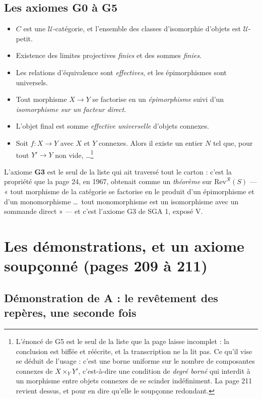 \documentclass[11pt,a4paper]{article}
\begin{document}
\subsection*{Les axiomes G0 à G5}

\begin{itemize}
\item[\textbf{G0}] $C$ est une $\mathcal{U}$-catégorie, et l'ensemble des
  classes d'isomorphie d'objets est $\mathcal{U}$-petit.
\item[\textbf{G1}] Existence des limites projectives \emph{finies} et des
  sommes \emph{finies}.
\item[\textbf{G2}] Les relations d'équivalence sont \emph{effectives}, et les
  épimorphismes sont universels.
\item[\textbf{G3}] Tout morphisme $X \to Y$ se factorise en un
  \emph{épimorphisme} suivi d'un \emph{isomorphisme sur un facteur direct}.
\item[\textbf{G4}] L'objet final est somme \emph{effective universelle}
  d'objets connexes.
\item[\textbf{G5}] Soit $f : X \to Y$ avec $X$ et $Y$ connexes. Alors il existe
  un entier $N$ tel que, pour tout $Y' \to Y$ non vide, \dots\footnote{L'énoncé
  de G5 est le seul de la liste que la page laisse incomplet : la conclusion
  est biffée et réécrite, et la transcription ne la lit pas. Ce qu'il vise se
  déduit de l'usage : c'est une borne uniforme sur le nombre de composantes
  connexes de $X \times_{Y} Y'$, c'est-à-dire une condition de \emph{degré
  borné} qui interdit à un morphisme entre objets connexes de se scinder
  indéfiniment. La page 211 revient dessus, et pour en dire qu'elle le soupçonne
  redondant.}
\end{itemize}

L'axiome \textbf{G3} est le seul de la liste qui ait traversé tout le carton :
c'est la propriété que la page 24, en 1967, obtenait comme un \emph{théorème}
sur $\mathrm{Rev}^{\mathcal{R}}(S)$ --- « tout morphisme de la catégorie se
factorise en le produit d'un épimorphisme et d'un monomorphisme \dots\ tout
monomorphisme est un isomorphisme avec un sommande direct » --- et c'est
l'axiome G3 de SGA 1, exposé V.

\section*{Les démonstrations, et un axiome soupçonné (pages 209 à 211)}

\subsection*{Démonstration de A : le revêtement des repères, une seconde fois}
\end{document}
